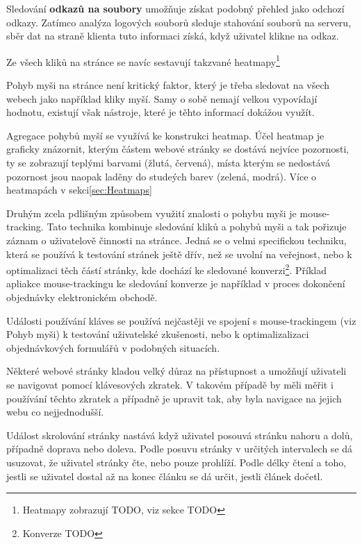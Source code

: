 \documentclass[bc,female,java,dept456]{diploma}						%
\begin{document}
Sledování {\bf odkazů na soubory} umožňuje získat podobný přehled jako odchozí odkazy. Zatímco analýza logových souborů sleduje stahování souborů na serveru, sběr dat na straně klienta tuto informaci získá, když uživatel klikne na odkaz.

Ze všech kliků na stránce se navíc sestavují takzvané heatmapy\footnote{Heatmapy zobrazují TODO, viz sekce TODO}





Pohyb myši na stránce není kritický faktor, který je třeba sledovat na všech webech jako například kliky myší. Samy o sobě nemají velkou vypovídají hodnotu, existují však nástroje, které je těhto informací dokážou využít.

Agregace pohybů myší se využívá ke konstrukci heatmap. Účel heatmap je graficky znázornit, kterým částem webové stránky se dostává nejvíce pozornosti, ty se zobrazují teplými barvami (žlutá, červená), místa kterým se nedostává pozornost jsou naopak laděny do studeých barev (zelená, modrá). Více o heatmapách v sekci\ref{sec:Heatmaps}


Druhým zcela pdlišným způsobem využití znalosti o pohybu myši je mouse-tracking. Tato technika kombinuje sledování kliků a pohybů myši a tak pořizuje záznam o uživatelově činnosti na stránce. Jedná se o velmi specifickou techniku, která se používá k testování stránek ještě dřív, než se uvolní na veřejnost, nebo k optimalizaci těch částí stránky, kde dochází ke sledované konverzi\footnote{Konverze TODO}. Příklad apliakce mouse-trackingu ke sledování konverze je například v proces dokončení objednávky elektronickém obchodě.





Události používání kláves se používá nejčastěji ve spojení s mouse-trackingem (viz Pohyb myši) k testování uživatelské zkušenosti, nebo k optimalizalizaci objednávkových formulářů v podobných situacích.

Některé webové stránky kladou velký důraz na přístupnost a umožňují uživateli se navigovat pomocí klávesových zkratek. V takovém případě by měli měřit i používání těchto zkratek a případně je upravit tak, aby byla navigace na jejich webu co nejjednodušší.




Událost skrolování stránky nastává když uživatel posouvá stránku nahoru a dolů, případně doprava nebo doleva. Podle  posuvu stránky v určitých intervalech se dá usuzovat, že uživatel stránky čte, nebo pouze prohlíží. Podle délky čtení a toho, jestli se uživatel dostal až na konec článku se dá určit, jestli článek dočetl.
\end{document}
